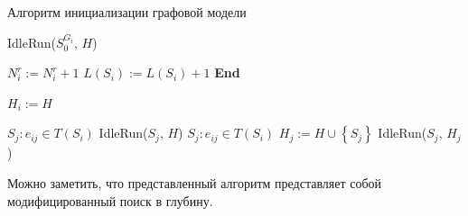 \begin{algorithm}[H]
	\caption{Алгоритм инициализации графовой модели}
	\label{lst:pycomsdk_init}
	\begin{algorithmic}[1]
		 
		\State IdleRun($S_0^{G_i}$, $H$) 
		\EndIf{}

		\State $N_i^r := N_i^r + 1$
		 
		\State $L(S_i) := L(S_i) + 1$
		\EndIf{}
		\State \textbf{End}
		\EndIf{}

		\State $H_i := H$
		\EndIf{}

		\State $S_j: e_{ij}\in T(S_i)$
		\State IdleRun($S_j$, $H$)
		\Else{}
		\State $S_j: e_{ij}\in T(S_i)$
		\State $H_j := H \cup \left\{S_j\right\}$
		\State IdleRun($S_j$, $H_j$)
		\EndFor
		\EndIf{}

		\EndFunction
	\end{algorithmic}
\end{algorithm}
Можно заметить, что представленный алгоритм представляет собой модифицированный поиск в глубину.

